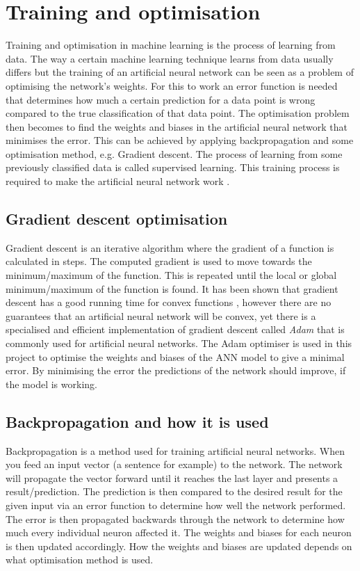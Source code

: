 \section{Training and optimisation} \label{sec:trainingoptimisation}
Training and optimisation in machine learning is the process of learning from data. The way a certain machine learning technique learns from data usually differs but the training of an artificial neural network can be seen as a problem of optimising the network's weights. For this to work an error function is needed that determines how much a certain prediction for a data point is wrong compared to the true classification of that data point. The optimisation problem then becomes to find the weights and biases in the artificial neural network that minimises the error. This can be achieved by applying backpropagation and some optimisation method, e.g. Gradient descent. The process of learning from some previously classified data is called supervised learning. This training process is required to make the artificial neural network work \parencite{Goodfellow-et-al-2016}.

\subsection{Gradient descent optimisation}\label{sec:gradient_descent}
Gradient descent is an iterative algorithm where the gradient of a function is calculated in steps. The computed gradient is used to move towards the minimum/maximum of the function. This is repeated until the local or global minimum/maximum of the function is found. It has been shown that gradient descent has a good running time for convex functions \parencite{convexSGD}, however there are no guarantees that an artificial neural network will be convex, yet there is a specialised and efficient implementation of gradient descent called \textit{Adam} \parencite{adamoptimizer} that is commonly used for artificial neural networks. The Adam optimiser is used in this project to optimise the weights and biases of the ANN model to give a minimal error. By minimising the error the predictions of the network should improve, if the model is working.

\subsection{Backpropagation and how it is used}\label{sec:backpropagation}
Backpropagation is a method used for training artificial neural networks. When you feed an input vector (a sentence for example) to the network. The network will propagate the vector forward until it reaches the last layer and presents a result/prediction. The prediction is then compared to the desired result for the given input via an error function to determine how well the network performed. The error is then propagated backwards through the network to determine how much every individual neuron affected it. The weights and biases for each neuron is then updated accordingly. How the weights and biases are updated depends on what optimisation method is used.

